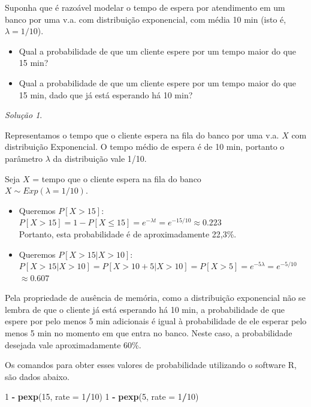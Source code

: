 \documentclass[
]{book}
\newenvironment{Shaded}{\begin{snugshade}}{\end{snugshade}}
\newcommand{\DataTypeTok}[1]{\textcolor[rgb]{0.13,0.29,0.53}{#1}}
\newcommand{\DecValTok}[1]{\textcolor[rgb]{0.00,0.00,0.81}{#1}}
\newcommand{\KeywordTok}[1]{\textcolor[rgb]{0.13,0.29,0.53}{\textbf{#1}}}
\newcommand{\NormalTok}[1]{#1}
\newcommand{\OperatorTok}[1]{\textcolor[rgb]{0.81,0.36,0.00}{\textbf{#1}}}
\newcommand{\StringTok}[1]{\textcolor[rgb]{0.31,0.60,0.02}{#1}}
\theoremstyle{definition}
\theoremstyle{definition}
\theoremstyle{definition}
\theoremstyle{remark}
\newtheorem*{solution}{Solução}
\begin{document}
Suponha que é razoável modelar o tempo de espera por atendimento em um banco por uma v.a. com distribuição exponencial, com média 10 min (isto é, \(\lambda = 1/10\)).

\begin{itemize}
\item
  Qual a probabilidade de que um cliente espere por um tempo maior do que 15 min?
\item
  Qual a probabilidade de que um cliente espere por um tempo maior do que 15 min, dado que já está esperando há 10 min?
\end{itemize}

\begin{solution}
{}
\end{solution}

Representamos o tempo que o cliente espera na fila do banco por uma v.a. \(X\) com distribuição Exponencial. O tempo médio de espera é de 10 min, portanto o parâmetro \(\lambda\) da distribuição vale 1/10.

Seja \(X\) = tempo que o cliente espera na fila do banco\\
\(X \sim Exp(\lambda = 1/10)\).

\begin{itemize}
\item
  Queremos \(P[X > 15]\):\\
  \(P[X > 15] = 1 - P[X \leq 15] = e^{-\lambda t} = e^{- 15/10} \approx 0.223\)\\
  Portanto, esta probabilidade é de aproximadamente 22,3\%.
\item
  Queremos \(P[X > 15 | X > 10]\):\\
  \(P[X > 15 | X > 10] = P[X > 10 + 5 | X > 10] = P[X > 5] = e^{-5\lambda}= e^{-5/10}\) \(\approx 0.607\)
\end{itemize}

Pela propriedade de ausência de memória, como a distribuição exponencial não se lembra de que o cliente já está esperando há 10 min, a probabilidade de que espere por pelo menos 5 min adicionais é igual à probabilidade de ele esperar pelo menos 5 min no momento em que entra no banco. Neste caso, a probabilidade desejada vale aproximadamente 60\%.

Os comandos para obter esses valores de probabilidade utilizando o software R, são dados abaixo.

\begin{Shaded}
\begin{Highlighting}[]
\DecValTok{1} \OperatorTok{-}\StringTok{ }\KeywordTok{pexp}\NormalTok{(}\DecValTok{15}\NormalTok{, }\DataTypeTok{rate =} \DecValTok{1}\OperatorTok{/}\DecValTok{10}\NormalTok{)  }
\DecValTok{1} \OperatorTok{-}\StringTok{ }\KeywordTok{pexp}\NormalTok{(}\DecValTok{5}\NormalTok{, }\DataTypeTok{rate =} \DecValTok{1}\OperatorTok{/}\DecValTok{10}\NormalTok{)}
\end{Highlighting}
\end{Shaded}
\end{document}
